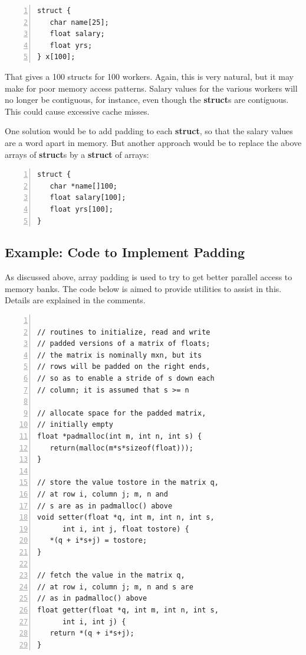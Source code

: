 \begin{lstlisting}[numbers=left]
struct {
   char name[25];
   float salary;
   float yrs;
} x[100];
\end{lstlisting}

That gives a 100 structs for 100 workers.  Again, this is very natural,
but it may make for poor memory access patterns.  Salary values for the
various workers will no longer be contiguous, for instance, even though
the {\bf struct}s are contiguous.  This could cause excessive cache
misses.

One solution would be to add padding to each {\bf struct}, so that the
salary values are a word apart in memory.  But another approach would be
to replace the above arrays of {\bf struct}s by a {\bf struct} of
arrays:

\begin{lstlisting}[numbers=left]
struct {
   char *name[]100;
   float salary[100];
   float yrs[100];
} 
\end{lstlisting}

\subsection{Example:  Code to Implement Padding}

As discussed above, array padding is used to try to get better parallel
access to memory banks.  The code below is aimed to provide utilities to
assist in this.  Details are explained in the comments.

\begin{lstlisting}[numbers=left]

// routines to initialize, read and write
// padded versions of a matrix of floats;
// the matrix is nominally mxn, but its
// rows will be padded on the right ends,
// so as to enable a stride of s down each
// column; it is assumed that s >= n

// allocate space for the padded matrix,
// initially empty
float *padmalloc(int m, int n, int s) {
   return(malloc(m*s*sizeof(float)));
}

// store the value tostore in the matrix q,
// at row i, column j; m, n and
// s are as in padmalloc() above
void setter(float *q, int m, int n, int s,
      int i, int j, float tostore) {
   *(q + i*s+j) = tostore;
}

// fetch the value in the matrix q,
// at row i, column j; m, n and s are
// as in padmalloc() above
float getter(float *q, int m, int n, int s,
      int i, int j) {
   return *(q + i*s+j);
}
\end{lstlisting}


